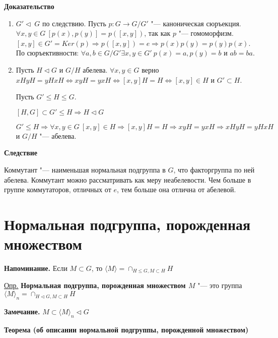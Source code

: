 \documentclass{article}
\begin{document}
\textbf{Доказательство}
\begin{enumerate}
	\item $G' \triangleleft \  G$ по следствию. Пусть $p: G \rightarrow G/G'$ "--- каноническая сюръекция. $\forall x, y \in G \  [p(x), p(y)] = p([x, y])$, так как $p$ "--- гомоморфизм. $[x, y] \in G' = Ker(p) \Rightarrow p([x, y]) = e \Rightarrow p(x)p(y) = p(y)p(x)$. По сюръективности: $\forall a, b \in G/G' \exists x, y \in G' \  p(x) = a, p(y) = b$ и $ab = ba$.
	
	\item Пусть $H \triangleleft G$ и $G/H$ абелева. $\forall x, y \in G$ верно $xHyH = yHxH \Leftrightarrow xyH = yxH \Leftrightarrow [x, y]H = H \Leftrightarrow [x,y] \in H$ и $G' \subset H$.
	
	Пусть $G' \leq H \leq G$.
	
	$[H, G] \subset G' \leq H \Rightarrow H \triangleleft G$
	
	$G' \leq H \Rightarrow \forall x, y \in G \  [x, y] \in H \Rightarrow [x, y]H = H \Rightarrow xyH = yxH  \Rightarrow xHyH = yHxH$ и $G/H$ "--- абелева.
\end{enumerate}

\vspace{10pt}

\textbf{Следствие}

Коммутант "--- наименьшая нормальная подгруппа в $G$, что факторгруппа по ней абелева. Коммутант можно рассматривать как меру неабелевости. Чем больше в группе коммутаторов, отличных от $e$, тем больше она отлична от абелевой.

\section{Нормальная подгруппа, порожденная множеством}

\textbf{Напоминание.} Если $M \subset G$, то $\langle M \rangle = \cap_{H \leq G, M \subset H} H$

\vspace{5pt}

\underline{Опр.} \textbf{Нормальная подгруппа, порожденная множеством $M$} "--- это группа $\langle M \rangle_{n} = \cap_{H \triangleleft G, M \subset H} H$

\vspace{5pt}

\textbf{Замечание.}
$M \subset \langle M \rangle_n \triangleleft G$

\textbf{Теорема (об описании нормальной подгруппы, порожденной множеством)}
\end{document}
